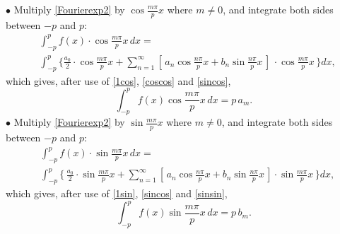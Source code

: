 \documentclass[12pt]{article}
\numberwithin{equation}{section}
\begin{document}
$\bullet$ Multiply \eqref{Fourierexp2} by $\cos \frac{m\pi}{p}x$ where 
$m \neq 0$, and integrate both sides between $-p$ and $p$:
\begin{align*}
& \int_{-p}^p  f(x) \cdot  \cos \frac{m\pi}{p}x \,dx=\\
& \int_{-p}^p \{ \frac{a_0}{2} \cdot \cos \frac{m\pi}{p}x  
 +\sum_{n=1}^{\infty}[\,a_n \cos \frac{n\pi}{p}x+b_n \sin \frac{n\pi}{p}x\,]
\, \cdot \cos \frac{m\pi}{p}x \,\} dx  ,
\end{align*}
which gives, after use of \eqref{1cos}, \eqref{coscos} and \eqref{sincos},
\[
\int_{-p}^p f(x) \cos \frac{m\pi}{p}x\, dx=p\,a_m.
\]
$\bullet$ Multiply \eqref{Fourierexp2} by $\sin \frac{m\pi}{p}x$ where 
$m \neq 0$, and integrate both sides between $-p$ and $p$:
\begin{align*}
 &\int_{-p}^p  f(x) \cdot \sin \frac{m\pi}{p}x \,dx=\\
 &\int_{-p}^p  \{ \, \frac{a_0}{2} \cdot \sin \frac{m\pi}{p}x +
\sum_{n=1}^{\infty}[\,a_n \cos \frac{n\pi}{p}x+b_n \sin \frac{n\pi}{p}x\,]
\cdot \sin \frac{m\pi}{p}x \,\} dx ,
\end{align*}
which gives, after use of \eqref{1sin}, \eqref{sincos} and \eqref{sinsin},
\[
\int_{-p}^p f(x) \sin \frac{m\pi}{p}x\, dx=p\,b_m.
\]
\vskip 1cm
\end{document}
